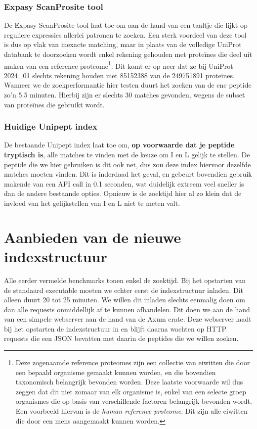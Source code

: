 \subsubsection{Expasy ScanProsite tool}
De Expasy ScanProsite tool\cite{scanprosite} laat toe om aan de hand van een taaltje die lijkt op reguliere expressies allerlei patronen te zoeken.
Een sterk voordeel van deze tool is dus op vlak van inexacte matching, maar in plaats van de volledige UniProt databank te doorzoeken wordt enkel rekening gehouden met proteïnes die deel uit maken van een reference proteome\footnote{Deze zogenaamde reference proteomes zijn een collectie van eiwitten die door een bepaald organisme gemaakt kunnen worden, en die bovendien taxonomisch belangrijk bevonden worden. Deze laatste voorwaarde wil dus zeggen dat dit niet zomaar van elk organisme is, enkel van een selecte groep organismes die op basis van verschillende factoren belangrijk bevonden wordt. Een voorbeeld hiervan is de \textit{human reference proteome}. Dit zijn alle eiwitten die door een mens aangemaakt kunnen worden.}.
Dit komt er op neer dat ze bij UniProt 2024\_01 slechts rekening houden met 85152388 van de 249751891 proteïnes.
Wanneer we de zoekperformantie hier testen duurt het zoeken van de ene peptide zo'n 5.5 minuten.
Hierbij zijn er slechts 30 matches gevonden, wegens de subset van proteïnes die gebruikt wordt.

\subsubsection{Huidige Unipept index}
De bestaande Unipept index laat toe om, \textbf{op voorwaarde dat je peptide tryptisch is}, alle matches te vinden met de keuze om I en L gelijk te stellen.
De peptide die we hier gebruiken is dit ook net, dus zou deze index hiervoor dezelfde matches moeten vinden.
Dit is inderdaad het geval, en gebeurt bovendien gebruik makende van een API call in 0.1 seconden, wat duidelijk extreem veel sneller is dan de andere bestaande opties.
Opnieuw is de zoektijd hier al zo klein dat de invloed van het gelijkstellen van I en L niet te meten valt.


\section{Aanbieden van de nieuwe indexstructuur}\label{sec:aanbieden-van-de-nieuwe-indexstructuur}
Alle eerder vermelde benchmarks tonen enkel de zoektijd.
Bij het opstarten van de standaard executable moeten we echter eerst de indexstructuur inladen.
Dit alleen duurt 20 tot 25 minuten.
We willen dit inladen slechts eenmalig doen om dan alle requests onmiddellijk af te kunnen afhandelen.
Dit doen we aan de hand van een simpele webserver aan de hand van de Axum crate\cite{axum}.
Deze webserver laadt bij het opstarten de indexstructuur in en blijft daarna wachten op HTTP requests die een JSON bevatten met daarin de peptides die we willen zoeken.


